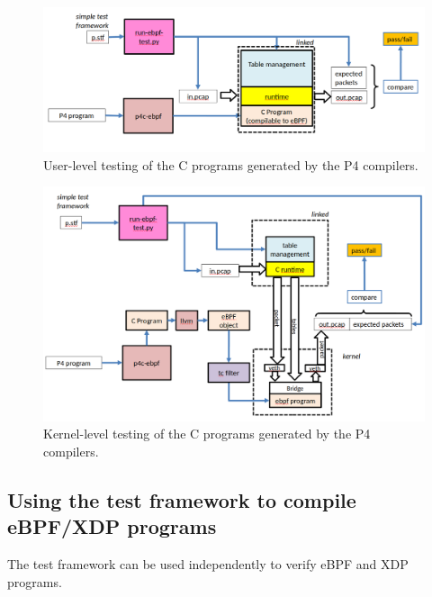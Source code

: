 \begin{figure}
	\centering
	\includegraphics[width=\linewidth]{user_test}
	\caption{User-level testing of the C programs generated by the P4 compilers.}
	\label{fig:user_test}
\end{figure}

\begin{figure}
	\centering
	\includegraphics[width=\linewidth]{kernel_test}
	\caption{Kernel-level testing of the C programs generated by the P4 
	compilers.}
	\label{fig:kernel_test}
\end{figure}

\subsection{Using the test framework to compile eBPF/XDP programs}
The test framework can be used independently to verify eBPF and XDP programs. 


